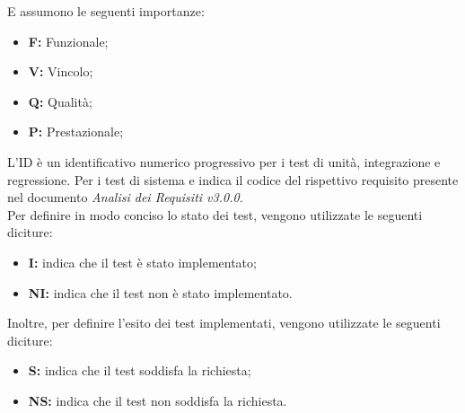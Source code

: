 E assumono le seguenti importanze:
\begin{itemize}
    \item \textbf{F:} Funzionale;
    \item \textbf{V:} Vincolo;
    \item \textbf{Q:} Qualità;
    \item \textbf{P:} Prestazionale;
\end{itemize}
L'ID è un identificativo numerico progressivo per i test di unità, integrazione e regressione. Per i test di sistema e
indica il codice del rispettivo requisito presente nel documento \textit{Analisi dei Requisiti v3.0.0.}\\
Per definire in modo conciso lo stato dei test, vengono utilizzate le seguenti diciture:
\begin{itemize}
    \item \textbf{I:} indica che il test è stato implementato;
    \item \textbf{NI:} indica che il test non è stato implementato.
\end{itemize}
Inoltre, per definire l'esito dei test implementati, vengono utilizzate le seguenti diciture:
\begin{itemize}
    \item \textbf{S:} indica che il test soddisfa la richiesta;
    \item \textbf{NS:} indica che il test non soddisfa la richiesta.
\end{itemize}